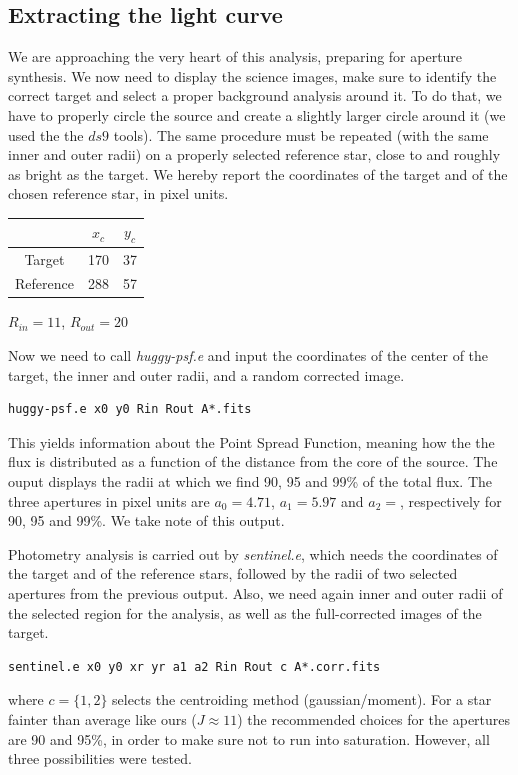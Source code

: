 \documentclass[a4paper,11pt,twocolumn]{article}
\begin{document}
\subsection{Extracting the light curve}
We are approaching the very heart of this analysis, preparing for 
aperture synthesis. We now need to display the science images, make 
sure to identify the correct target and select a proper background 
analysis around it. To do that, we have to properly circle the source 
and create a slightly larger circle around it (we used the the $ds9$ tools).
The same procedure must be repeated (with the same inner and outer radii) 
on a properly selected reference star, close to and roughly as bright 
as the target. We hereby report the coordinates of the target and of the 
chosen reference star, in pixel units.
\begin{center}
    \begin{tabular}{|c|c|c|}
    \hline
     & $x_c$ & $y_c$ \\
    \hline
    Target    &  170  &  37    \\
    Reference & 288 & 57  \\
    \hline
    \end{tabular}

    \medskip

    $R_{in} = 11$, $R_{out} = 20$
\end{center}
Now we need to call \textit{huggy-psf.e} and input the coordinates of the 
center of the target, the inner and outer radii, and a random corrected 
image.
\begin{lstlisting}
huggy-psf.e x0 y0 Rin Rout A*.fits
\end{lstlisting}
This yields information about the Point Spread Function, meaning how the 
the flux is distributed as a function of the distance from the core of 
the source. The ouput displays the radii at which we find 90, 95 and 99\%
of the total flux. The three apertures in pixel units are $a_0=4.71$, 
$a_1=5.97$ and $a_2=$, respectively for 90, 95 and 99\%. 
We take note of this output. 

Photometry analysis is carried out by \textit{sentinel.e}, which needs 
the coordinates of the target and of the reference stars, followed by 
the radii of two selected apertures from the previous output. Also, we need 
again inner and outer radii of the selected region for the analysis, as well 
as the full-corrected images of the target. 
\begin{lstlisting}
sentinel.e x0 y0 xr yr a1 a2 Rin Rout c A*.corr.fits
\end{lstlisting}
where $c=\{1,2\}$ selects the centroiding method (gaussian/moment). For a star
fainter than average like ours ($J\approx 11$) the recommended choices for 
the apertures are 90 and 95\%, in order to make sure not to run into 
saturation. However, all three possibilities were tested. 
\end{document}
